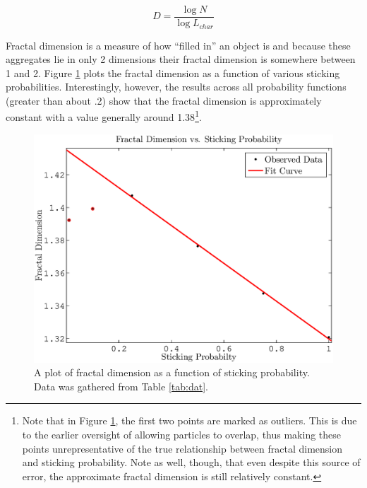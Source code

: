 \documentclass{article}
\begin{document}
\begin{equation}
	D = \frac{\log{N}}{\log{L_{char}}}
\label{eq:fd}
\end{equation}

Fractal dimension is a measure of how ``filled in'' an object is and because these aggregates lie in only 2 dimensions their fractal dimension is somewhere between 1 and 2. Figure \ref{fd_P} plots the fractal dimension as a function of various sticking probabilities. Interestingly, however, the results across all probability functions (greater than about .2) show that the fractal dimension is approximately constant with a value generally around 1.38\footnote{ Note that in Figure \ref{fd_P}, the first two points are marked as outliers. This is due to the earlier oversight of allowing particles to overlap, thus making these points unrepresentative of the true relationship between fractal dimension and sticking probability. Note as well, though, that even despite this source of error, the approximate fractal dimension is still relatively constant.}.

\begin{figure}[ht!]
\begin{center}
	\includegraphics[width=\textwidth]{fd_p.eps}
	\caption{A plot of fractal dimension as a function of sticking probability. Data was gathered from Table \ref{tab:dat}.}
	\label{fd_P}
\end{center}
\end{figure}
\end{document}
